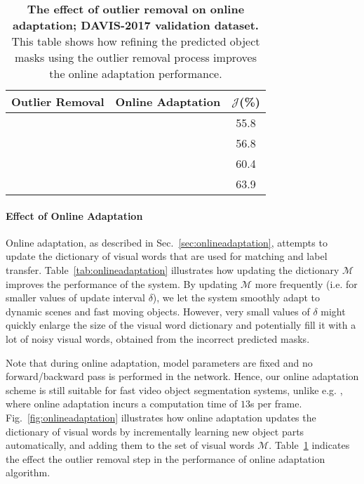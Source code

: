 \documentclass[10pt,twocolumn,letterpaper]{article}
\newcommand{\cmark}{\ding{51}}%
\newcommand{\xmark}{\ding{55}}%
\begin{document}
\begin{table}[t]
\begin{tabular}{ccc}
	    \hline
		Outlier Removal & Online Adaptation & ${\mathcal{J}}${\footnotesize (\%)} \\ \hline
		\xmark &\xmark & 55.8  \\
		\cmark &\xmark & 56.8  \\ 
		\xmark &\cmark & 60.4  \\ 
		\cmark &\cmark & 63.9  \\ 
	    \hline
	\end{tabular}
	\vspace{-0.1in}
	\caption{{\bf The effect of outlier removal on online adaptation; DAVIS-2017 validation dataset.} This table shows how refining the predicted object masks using the outlier removal process improves the online adaptation performance. }
	\label{table:outlierremoval}
	\vspace{-0.2in}
\end{table}\paragraph{Effect of Online Adaptation}
Online adaptation, as described in Sec.~\ref{sec:onlineadaptation}, attempts to update the dictionary of visual words that are used for matching and label transfer. Table~\ref{tab:onlineadaptation} illustrates how updating the dictionary $\mathcal{M}$ improves the performance of the system. By updating $\mathcal{M}$ more frequently (i.e. for smaller values of update interval $\delta$), we let the system smoothly adapt to dynamic scenes and fast moving objects. However, very small values of $\delta$ might quickly enlarge the size of the visual word dictionary and potentially fill it with a lot of noisy visual words, obtained from the incorrect predicted masks. 

Note that during online adaptation, model parameters are fixed and no forward/backward pass is performed in the network. Hence, our online adaptation scheme is still suitable for fast video object segmentation systems, unlike e.g. \cite{onavos}, where online adaptation incurs a computation time of $13$s per frame.
Fig.~\ref{fig:onlineadaptation} illustrates how online adaptation updates the dictionary of visual words by incrementally learning new object parts automatically, and adding them to the set of visual words $\mathcal{M}$.
Table~\ref{table:outlierremoval} indicates the effect the outlier removal step in the performance of online adaptation algorithm.
\end{document}
